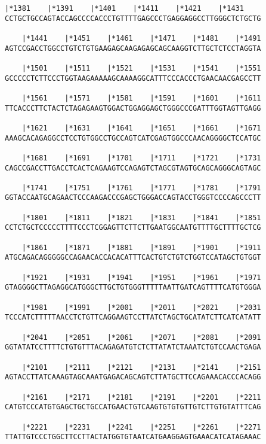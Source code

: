 \documentclass{article}
\begin{document}
\begin{Verbatim}[fontfamily=courier]
    |*1381    |*1391    |*1401    |*1411    |*1421    |*1431
CCTGCTGCCAGTACCAGCCCCACCCTGTTTTGAGCCCTGAGGAGGCCTTGGGCTCTGCTG

    |*1441    |*1451    |*1461    |*1471    |*1481    |*1491
AGTCCGACCTGGCCTGTCTGTGAAGAGCAAGAGAGCAGCAAGGTCTTGCTCTCCTAGGTA

    |*1501    |*1511    |*1521    |*1531    |*1541    |*1551
GCCCCCTCTTCCCTGGTAAGAAAAAGCAAAAGGCATTTCCCACCCTGAACAACGAGCCTT

    |*1561    |*1571    |*1581    |*1591    |*1601    |*1611
TTCACCCTTCTACTCTAGAGAAGTGGACTGGAGGAGCTGGGCCCGATTTGGTAGTTGAGG

    |*1621    |*1631    |*1641    |*1651    |*1661    |*1671
AAAGCACAGAGGCCTCCTGTGGCCTGCCAGTCATCGAGTGGCCCAACAGGGGCTCCATGC

    |*1681    |*1691    |*1701    |*1711    |*1721    |*1731
CAGCCGACCTTGACCTCACTCAGAAGTCCAGAGTCTAGCGTAGTGCAGCAGGGCAGTAGC

    |*1741    |*1751    |*1761    |*1771    |*1781    |*1791
GGTACCAATGCAGAACTCCCAAGACCCGAGCTGGGACCAGTACCTGGGTCCCCAGCCCTT

    |*1801    |*1811    |*1821    |*1831    |*1841    |*1851
CCTCTGCTCCCCCTTTTCCCTCGGAGTTCTTCTTGAATGGCAATGTTTTGCTTTTGCTCG

    |*1861    |*1871    |*1881    |*1891    |*1901    |*1911
ATGCAGACAGGGGGCCAGAACACCACACATTTCACTGTCTGTCTGGTCCATAGCTGTGGT

    |*1921    |*1931    |*1941    |*1951    |*1961    |*1971
GTAGGGGCTTAGAGGCATGGGCTTGCTGTGGGTTTTTAATTGATCAGTTTTCATGTGGGA

    |*1981    |*1991    |*2001    |*2011    |*2021    |*2031
TCCCATCTTTTTAACCTCTGTTCAGGAAGTCCTTATCTAGCTGCATATCTTCATCATATT

    |*2041    |*2051    |*2061    |*2071    |*2081    |*2091
GGTATATCCTTTTCTGTGTTTACAGAGATGTCTCTTATATCTAAATCTGTCCAACTGAGA

    |*2101    |*2111    |*2121    |*2131    |*2141    |*2151
AGTACCTTATCAAAGTAGCAAATGAGACAGCAGTCTTATGCTTCCAGAAACACCCACAGG

    |*2161    |*2171    |*2181    |*2191    |*2201    |*2211
CATGTCCCATGTGAGCTGCTGCCATGAACTGTCAAGTGTGTGTTGTCTTGTGTATTTCAG

    |*2221    |*2231    |*2241    |*2251    |*2261    |*2271
TTATTGTCCCTGGCTTCCTTACTATGGTGTAATCATGAAGGAGTGAAACATCATAGAAAC

\end{Verbatim}
\newpage
\end{document}
